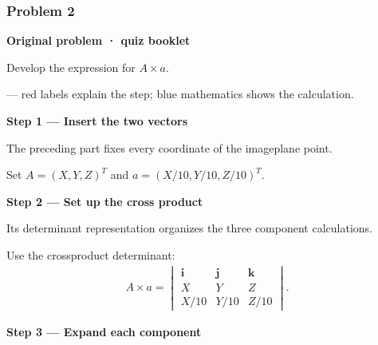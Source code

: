 \documentclass[letterpaper,11pt,english,openany,oneside]{jupyterBook}
\begin{document}
\subsubsection{Problem 2}
\label{\detokenize{lectures/lecture03/quiz-workbook:quiz-14-q2}}\label{\detokenize{lectures/lecture03/quiz-workbook:id6}}
\par\medskip\textbf{Original problem · quiz booklet}\par\smallskip

\sphinxAtStartPar
Develop the expression for \(A\times a\).

\par\medskip

\sphinxAtStartPar
{} — red labels explain the step; blue mathematics shows the calculation.

\par\medskip{}
{\color{QuizStepRed}\bfseries Step 1 — Insert the two vectors}\par\smallskip

\sphinxAtStartPar
{} The preceding part fixes every coordinate of the image\sphinxhyphen{}plane point.

\sphinxAtStartPar
Set {\color{QuizMathBlue} \(A=(X,Y,Z)^T\)} and {\color{QuizMathBlue} \(a=(X/10,Y/10,Z/10)^T\)}.

\par

\par\medskip{}
{\color{QuizStepRed}\bfseries Step 2 — Set up the cross product}\par\smallskip

\sphinxAtStartPar
{} Its determinant representation organizes the three component calculations.

\sphinxAtStartPar
Use the cross\sphinxhyphen{}product determinant:
{\color{QuizMathBlue} \begin{equation*}
\begin{split}
A\times a=\begin{vmatrix}\mathbf i&\mathbf j&\mathbf k\\X&Y&Z\\X/10&Y/10&Z/10\end{vmatrix}.
\end{split}
\end{equation*}}
\par

\par\medskip{}
{\color{QuizStepRed}\bfseries Step 3 — Expand each component}\par\smallskip
\end{document}
